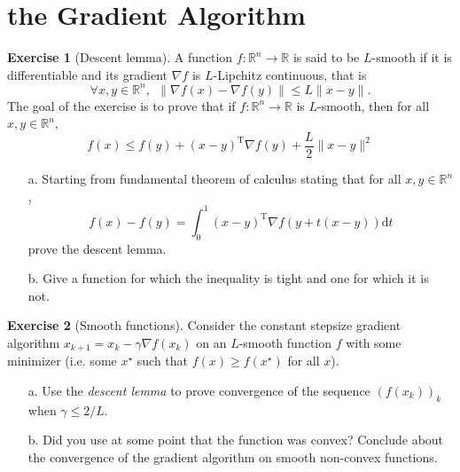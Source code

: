 \documentclass[a4paper,twoside,10pt]{amsart}
\numberwithin{equation}{section} %
\numberwithin{figure}{section} %
\numberwithin{table}{section} %
\theoremstyle{definition}
\newtheorem{q_td}{Exercise }
\begin{document}
\vspace*{1cm}




\section{the Gradient Algorithm}

\begin{q_td}[Descent lemma]
\label{td:smooth}
A function $f:\mathbb{R}^n\to\mathbb{R}$ is said to be $L$-smooth if it is differentiable and  its gradient $\nabla f$ is $L$-Lipchitz continuous, that is
$$\forall x,y\in\mathbb{R}^n, ~~  \|\nabla f(x) - \nabla f(y) \| \leq L \|x-y\|. $$ 
The goal of the exercise is to prove that if $f:\mathbb{R}^n\to\mathbb{R}$ is $L$-smooth, then for all $x,y\in\mathbb{R}^n$,
$$ f(x) \leq f(y) +  (x-y)^\mathrm{T} \nabla f(y)  + \frac{L}{2} \| x-y\|^2 $$
\begin{itemize}
\item[a.] Starting from fundamental theorem of calculus stating that for all $x,y\in\mathbb{R}^n$,
$$ f(x) - f(y) = \int_{0}^1  (x-y)^\mathrm{T} \nabla f(y + t(x-y) ) \mathrm{d}t $$
prove the descent lemma.
\item[b.] Give a function for which the inequality is tight and one for which it is not.
\end{itemize}
\end{q_td}

\vspace*{0.5cm}

\begin{q_td}[Smooth functions]
Consider the constant stepsize gradient algorithm $x_{k+1} = x_k - \gamma \nabla f(x_k)$ on an $L$-smooth function $f$ with some minimizer (i.e. some $x^\star$ such that $f(x)\geq f(x^\star)$ for all $x$). 
\begin{itemize}
\item[a.] Use the \emph{descent lemma} to prove convergence of the sequence $(f(x_k))_k$ when $\gamma\leq 2/L$.
\item[b.] Did you use at some point that the function was convex? Conclude about the convergence of the gradient algorithm on smooth non-convex functions.
\end{itemize}
\end{q_td}
\end{document}
